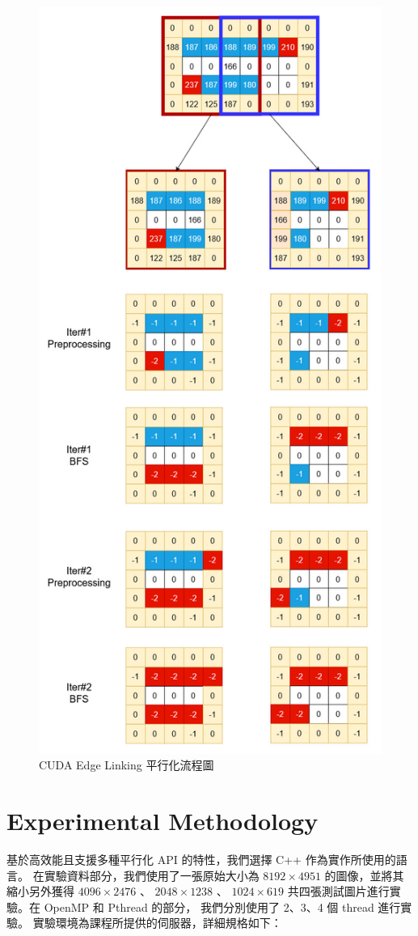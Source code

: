 \documentclass[sigconf,nonacm]{acmart}
\begin{document}
\begin{figure}[h]
  \centering
  \includegraphics[width=0.8\linewidth]{"./image/cuda_edge_link.jpg"}
  \caption{CUDA Edge Linking 平行化流程圖}
  \label{fig:cuda}
\end{figure}

\section{Experimental Methodology}

基於高效能且支援多種平行化 API 的特性，我們選擇 C++ 作為實作所使用的語言。
在實驗資料部分，我們使用了一張原始大小為 $8192 \times 4951$ 的圖像，並將其縮小另外獲得 $4096 \times 2476$ 、 
$2048 \times 1238$ 、 $1024 \times 619$ 共四張測試圖片進行實驗。在 OpenMP 和 Pthread 的部分，
我們分別使用了 2、3、4 個 thread 進行實驗。
實驗環境為課程所提供的伺服器，詳細規格如下：
\end{document}
